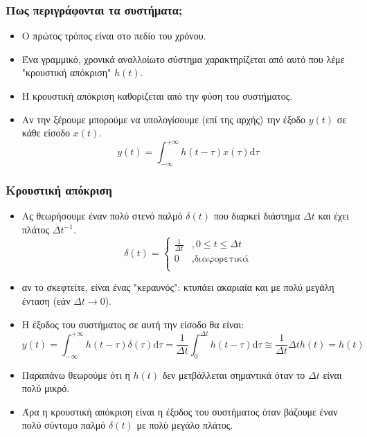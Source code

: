 \documentclass[9pt]{beamer}
\begin{document}
	\begin{frame}
	\frametitle{Πως περιγράφονται τα συστήματα;}
	\begin{itemize}		
		\item Ο πρώτος τρόπος είναι στο πεδίο του χρόνου.
		\item Ένα γραμμικό, χρονικά αναλλοίωτο σύστημα χαρακτηρίζεται από αυτό που λέμε "κρουστική απόκριση" $h(t)$.		
		\item Η κρουστική απόκριση καθορίζεται από την φύση του συστήματος.
		\item Αν την ξέρουμε μπορούμε να υπολογίσουμε (επί της αρχής) την έξοδο $y(t)$ σε κάθε είσοδο $x(t)$.
		\begin{equation}
		y(t)=\int_{-\infty}^{+\infty} h(t-\tau)x(\tau)\mathrm{d}\tau		
		\end{equation} 
	\end{itemize}
	\end{frame}

	\begin{frame}
		\frametitle{Κρουστική απόκριση}
		\begin{itemize}
			\item Ας θεωρήσουμε έναν πολύ στενό παλμό $\delta(t)$ που διαρκεί διάστημα $\Delta t$ και έχει πλάτος $\Delta t^{-1}$.
			\begin{equation}
			\delta(t)= \left\{
			\begin{array}{ll}
			\frac{1}{\Delta t} & ,0\le t \le \Delta t \\
			0 & ,\text{διαφορετικά}\\
			\end{array} 
			\right. 
			\end{equation}
		\item αν το σκεφτείτε, είναι ένας "κεραυνός": κτυπάει ακαριαία και με πολύ μεγάλη ένταση (εάν $\Delta t\rightarrow 0$).
		\item Η έξοδος του συστήματος σε αυτή την είσοδο θα είναι:
		\begin{equation}
		y(t)=\int_{-\infty}^{+\infty} h(t-\tau)\delta(\tau)\mathrm{d}\tau=
		\frac{1}{\Delta t}\int_{0}^{\Delta t}h(t-\tau)\mathrm{d}\tau\cong\frac{1}{\Delta t} \Delta th(t) = h(t)		
		\end{equation} 
		\item Παραπάνω θεωρούμε ότι η $h(t)$ δεν μετβάλλεται σημαντικά όταν το $\Delta t$ είναι πολύ μικρό.
		\item Άρα η κρουστική απόκριση είναι η έξοδος του συστήματος όταν βάζουμε έναν πολύ σύντομο παλμό $\delta(t)$ με πολύ μεγάλο πλάτος.
		\end{itemize}		
	\end{frame}
\end{document}
